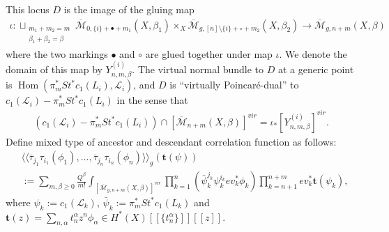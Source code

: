 \documentclass[12pt,reqno]{amsart}
\theoremstyle{plain}
\theoremstyle{definition}
\theoremstyle{remark}
\begin{document}
\begin{appendix}
This locus $D$ is the image of the gluing map
\begin{align*}
   \iota\colon \sqcup_{\substack{m_1+m_2=m\\ \beta_1+\beta_2=\beta}} \overline{\mathcal{M}}_{0,\{i\}+\bullet+m_1}(X,\beta_1)\times_{X} \overline{\mathcal{M}}_{g,[n]\setminus\{i\}+\circ+m_2}(X,\beta_2)\rightarrow \overline{\mathcal{M}}_{g,n+m}(X,\beta)
\end{align*}
where the two markings $\bullet$ and $\circ$ are glued together under map $\iota$.
We denote the domain of this map by $Y_{n,m,\beta}^{(i)}$. The virtual normal bundle to $D$ at a generic
point is $\operatorname{Hom}(\pi_m^* St^*c_1(L_i), \mathcal{L}_i)$, and $D$ is ``virtually Poincar\'e-dual'' to $c_1(\mathcal{L}_i)-\pi_m^* St^*c_1(L_i)$ in the sense that
\begin{align}
\label{eqn:D-Y-vir}  \left(c_1(\mathcal{L}_i)-\pi_m^* St^*c_1(L_i)\right) \cap [\overline{\mathcal{M}}_{n+m}{(X,\beta)}]^{vir} =\iota_*[Y_{n,m,\beta}^{(i)}]^{vir}.
\end{align}
Define mixed type of ancestor and descendant correlation function as follows:
\begin{align*}
&\langle\langle\bar{\tau}_{j_1}\tau_{i_1}(\phi_1),\dots,\bar{\tau}_{j_n}\tau_{i_n}(\phi_n)\rangle\rangle_g(\mathbf{t}(\psi))
\nonumber\\&:=\sum_{m,\beta\geq0}\frac{Q^\beta}{m!}
\int_{[\overline{\mathcal{M}}_{g,n+m}(X,\beta)]^{vir}} \prod_{k=1}^{n}\left(\bar{\psi}_{k}^{j_k}\psi_k^{i_k}ev_k^*\phi_k\right)\prod_{k=n+1}^{n+m}ev_k^*\mathbf{t}(\psi_{k}),
\end{align*}
 where $\psi_k:=c_1(\mathcal{L}_k)$, $\bar{\psi}_k:=\pi_m^*St^*c_1(L_k)$ and $\mathbf{t}(z)=\sum_{n,\alpha}t_n^\alpha z^n\phi_\alpha\in H^*(X)[[\{t_n^\alpha\}]][[z]]$. 

\end{appendix}
\end{document}
